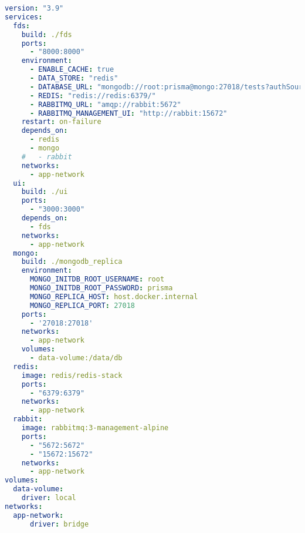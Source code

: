   \begin{lstlisting}[caption={Docker Compose usage (YAML)}, label={code:compose}, language=yaml]
version: "3.9"
services:
  fds:
    build: ./fds
    ports:
      - "8000:8000"
    environment:
      - ENABLE_CACHE: true
      - DATA_STORE: "redis"
      - DATABASE_URL: "mongodb://root:prisma@mongo:27018/tests?authSource=admin/"
      - REDIS: "redis://redis:6379/"
      - RABBITMQ_URL: "amqp://rabbit:5672"
      - RABBITMQ_MANAGEMENT_UI: "http://rabbit:15672"
    restart: on-failure
    depends_on:
      - redis
      - mongo
    #   - rabbit
    networks:
      - app-network
  ui:
    build: ./ui
    ports: 
      - "3000:3000"
    depends_on: 
      - fds
    networks:
      - app-network  
  mongo:
    build: ./mongodb_replica
    environment:
      MONGO_INITDB_ROOT_USERNAME: root
      MONGO_INITDB_ROOT_PASSWORD: prisma
      MONGO_REPLICA_HOST: host.docker.internal
      MONGO_REPLICA_PORT: 27018
    ports:
      - '27018:27018'
    networks:
      - app-network
    volumes:
      - data-volume:/data/db
  redis:
    image: redis/redis-stack
    ports:
      - "6379:6379"
    networks: 
      - app-network
  rabbit:
    image: rabbitmq:3-management-alpine
    ports:
      - "5672:5672"
      - "15672:15672"
    networks:
      - app-network
volumes:
  data-volume:
    driver: local
networks:
  app-network:
      driver: bridge
  \end{lstlisting}
  
\newpage
\thispagestyle{empty}      
\noindent

\newpage
